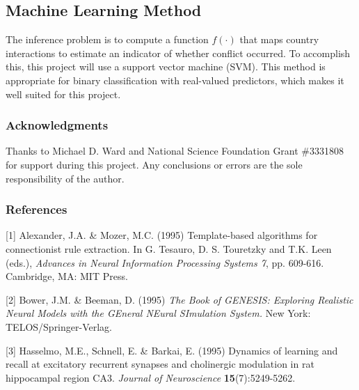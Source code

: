 \documentclass[12pt,letterpaper]{article} %
\begin{document}
\subsection{Machine Learning Method}


The inference problem is to compute a function $f(\cdot)$ that maps country interactions to estimate an indicator of whether conflict occurred. To accomplish this, this project will use a support vector machine (SVM). This method is appropriate for binary classification with real-valued predictors, which makes it well suited for this project.










\subsubsection*{Acknowledgments}

Thanks to Michael D. Ward and National Science Foundation Grant \#3331808 for support during this project. Any conclusions or errors are the sole responsibility of the author.

\subsubsection*{References}


\small{
[1] Alexander, J.A. \& Mozer, M.C. (1995) Template-based algorithms
for connectionist rule extraction. In G. Tesauro, D. S. Touretzky
and T.K. Leen (eds.), {\it Advances in Neural Information Processing
Systems 7}, pp. 609-616. Cambridge, MA: MIT Press.

[2] Bower, J.M. \& Beeman, D. (1995) {\it The Book of GENESIS: Exploring
Realistic Neural Models with the GEneral NEural SImulation System.}
New York: TELOS/Springer-Verlag.

[3] Hasselmo, M.E., Schnell, E. \& Barkai, E. (1995) Dynamics of learning
and recall at excitatory recurrent synapses and cholinergic modulation
in rat hippocampal region CA3. {\it Journal of Neuroscience}
{\bf 15}(7):5249-5262.
}
\end{document}
